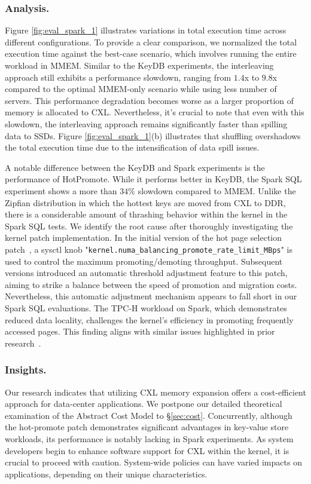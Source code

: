 \subsubsection{Analysis.}

Figure \ref{fig:eval_spark_1} illustrates variations in total execution time across different configurations. To provide a clear comparison, we normalized the total execution time against the best-case scenario, which involves running the entire workload in MMEM. Similar to the KeyDB experiments, the interleaving approach still exhibits a performance slowdown, ranging from $1.4$x to $9.8$x compared to the optimal MMEM-only scenario while using less number of servers. This performance degradation becomes worse as a larger proportion of memory is allocated to CXL. Nevertheless, it's crucial to note that even with this slowdown, the interleaving approach remains significantly faster than spilling data to SSDs. Figure \ref{fig:eval_spark_1}(b) illustrates that shuffling overshadows the total execution time due to the intensification of data spill issues.

A notable difference between the KeyDB and Spark experiments is the performance of HotPromote.
While it performs better in KeyDB, the Spark SQL experiment shows a more than $34\%$ slowdown compared to MMEM.
Unlike the Zipfian distribution in which the hottest keys are moved from CXL to DDR, there is a considerable amount of thrashing behavior within the kernel in the Spark SQL tests.
We identify the root cause after thoroughly investigating the kernel patch implementation.
In the initial version of the hot page selection patch~\cite{hot}, a sysctl knob  "\texttt{kernel.numa\_balancing\_promote\_rate\_limit\_MBps}" is used to control the maximum promoting/demoting throughput.
Subsequent versions introduced an automatic threshold adjustment feature to this patch, aiming to strike a balance between the speed of promotion and migration costs. Nevertheless, this automatic adjustment mechanism appears to fall short in our Spark SQL evaluations. The TPC-H workload on Spark, which demonstrates reduced data locality, challenges the kernel's efficiency in promoting frequently accessed pages. This finding aligns with similar issues highlighted in prior research~\cite{demystify}.

\subsubsection{Insights.}
Our research indicates that utilizing CXL memory expansion offers a cost-efficient approach for data-center applications. We postpone our detailed theoretical examination of the Abstract Cost Model to \S\ref{sec:cost}. Concurrently, although the hot-promote patch demonstrates significant advantages in key-value store workloads, its performance is notably lacking in Spark experiments. As system developers begin to enhance software support for CXL within the kernel, it is crucial to proceed with caution. System-wide policies can have varied impacts on applications, depending on their unique characteristics.


